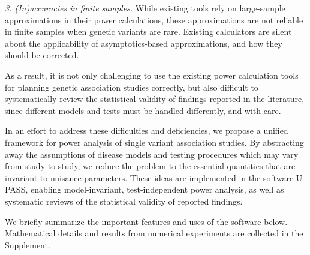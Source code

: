     {\it 3. (In)accuracies in finite samples.} While existing tools rely on large-sample approximations in their power calculations, these approximations are not reliable in finite samples when genetic variants are rare. Existing calculators are silent about the applicability of asymptotics-based approximations, and how they should be corrected.

As a result, it is not only challenging to use the existing power calculation tools for planning genetic association studies correctly, but also difficult to systematically review the statistical validity of findings reported in the literature, since different models and tests must be handled differently, and with care.

In an effort to address these difficulties and deficiencies, we propose a unified framework for power analysis of single variant association studies.
By abstracting away the assumptions of disease models and testing procedures which may vary from study to study, we reduce the problem to the essential quantities that are invariant to nuisance parameters. 
These ideas are implemented in the software U-PASS, enabling model-invariant, test-independent power analysis, as well as systematic reviews of the statistical validity of reported findings.

We briefly summarize the important features and uses of the software below.
Mathematical details and results from numerical experiments are collected in the Supplement.


